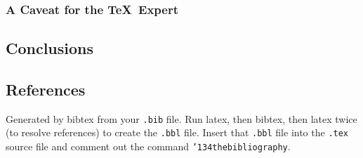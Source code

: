 \subsubsection*{A Caveat for the \TeX\ Expert}
\subsection{Conclusions}
\subsection{References}
Generated by bibtex from your \texttt{.bib} file.  Run latex,
then bibtex, then latex twice (to resolve references)
to create the \texttt{.bbl} file.  Insert that \texttt{.bbl}
file into the \texttt{.tex} source file and comment out
the command \texttt{{\char'134}thebibliography}.
